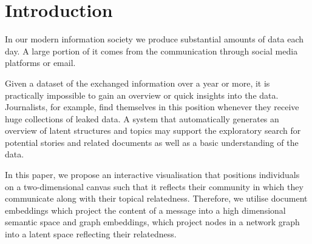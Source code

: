 \section{Introduction}



In our modern information society we produce substantial amounts of data each day.
A large portion of it comes from the communication through social media platforms or email.


Given a dataset of the exchanged information over a year or more, it is practically impossible to gain an overview or quick insights into the data.
Journalists, for example, find themselves in this position whenever they receive huge collections of leaked data.
A system that automatically generates an overview of latent structures and topics may support the exploratory search for potential stories and related documents as well as a basic understanding of the data.

In this paper, we propose an interactive visualisation that positions individuals on a two-dimensional canvas such that it reflects their community in which they communicate along with their topical relatedness.
Therefore, we utilise document embeddings which project the content of a message into a high dimensional semantic space and graph embeddings, which project nodes in a network graph into a latent space reflecting their relatedness.

